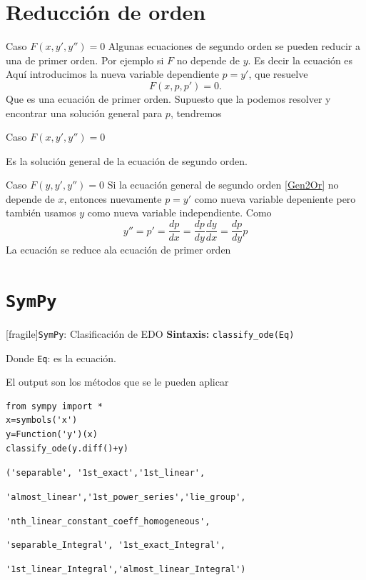 \documentclass{article}
\begin{document}
\section{Reducción de orden}
{Caso $F(x,y',y'')=0$}
Algunas ecuaciones de segundo orden
se pueden reducir a una de primer orden. Por ejemplo si $F$ no depende de $y$. Es decir la ecuación es
Aquí introducimos la nueva variable dependiente $\boxed{p=y'}$, que resuelve
\[F(x,p,p')=0.\]
Que es una ecuación de primer orden. Supuesto que la podemos resolver y encontrar una solución general para  $p$, tendremos
 



{Caso $F(x,y',y'')=0$}
 
Es la solución general de la ecuación de segundo orden.



{Caso $F(y,y',y'')=0$}\label{reduc_orden}
Si la ecuación general de segundo orden \eqref{Gen2Or} no depende de $x$, entonces nuevamente $\boxed{p=y'}$ como nueva variable depeniente
pero también usamos $\boxed{y}$ como nueva variable independiente. Como
\[y''=p'=\frac{dp}{dx}=\frac{dp}{dy}\frac{dy}{dx}=\frac{dp}{dy}p\]
La ecuación se reduce ala ecuación de primer orden



\section{\texttt{SymPy}}



[fragile]{\texttt{SymPy}: Clasificación de EDO}
\textbf{Sintaxis:} \verb+classify_ode(Eq)+

Donde
\verb+Eq+: es la ecuación.

El output son los métodos que se le pueden aplicar
\begin{lstlisting}
from sympy import *
x=symbols('x')
y=Function('y')(x)
classify_ode(y.diff()+y)
\end{lstlisting}

\verb+('separable', '1st_exact','1st_linear',+

\verb+'almost_linear','1st_power_series','lie_group',+


\verb+'nth_linear_constant_coeff_homogeneous', +

\verb+'separable_Integral', '1st_exact_Integral',  +

\verb+'1st_linear_Integral','almost_linear_Integral')+
\end{document}
